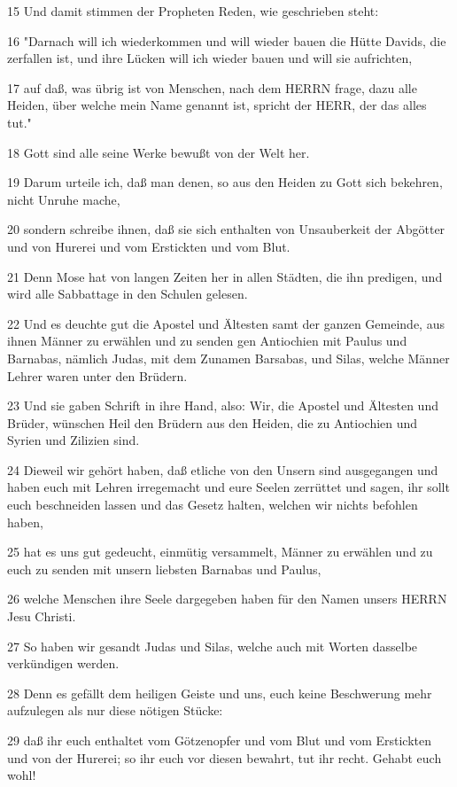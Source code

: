 \par 15 Und damit stimmen der Propheten Reden, wie geschrieben steht:
\par 16 "Darnach will ich wiederkommen und will wieder bauen die Hütte Davids, die zerfallen ist, und ihre Lücken will ich wieder bauen und will sie aufrichten,
\par 17 auf daß, was übrig ist von Menschen, nach dem HERRN frage, dazu alle Heiden, über welche mein Name genannt ist, spricht der HERR, der das alles tut."
\par 18 Gott sind alle seine Werke bewußt von der Welt her.
\par 19 Darum urteile ich, daß man denen, so aus den Heiden zu Gott sich bekehren, nicht Unruhe mache,
\par 20 sondern schreibe ihnen, daß sie sich enthalten von Unsauberkeit der Abgötter und von Hurerei und vom Erstickten und vom Blut.
\par 21 Denn Mose hat von langen Zeiten her in allen Städten, die ihn predigen, und wird alle Sabbattage in den Schulen gelesen.
\par 22 Und es deuchte gut die Apostel und Ältesten samt der ganzen Gemeinde, aus ihnen Männer zu erwählen und zu senden gen Antiochien mit Paulus und Barnabas, nämlich Judas, mit dem Zunamen Barsabas, und Silas, welche Männer Lehrer waren unter den Brüdern.
\par 23 Und sie gaben Schrift in ihre Hand, also: Wir, die Apostel und Ältesten und Brüder, wünschen Heil den Brüdern aus den Heiden, die zu Antiochien und Syrien und Zilizien sind.
\par 24 Dieweil wir gehört haben, daß etliche von den Unsern sind ausgegangen und haben euch mit Lehren irregemacht und eure Seelen zerrüttet und sagen, ihr sollt euch beschneiden lassen und das Gesetz halten, welchen wir nichts befohlen haben,
\par 25 hat es uns gut gedeucht, einmütig versammelt, Männer zu erwählen und zu euch zu senden mit unsern liebsten Barnabas und Paulus,
\par 26 welche Menschen ihre Seele dargegeben haben für den Namen unsers HERRN Jesu Christi.
\par 27 So haben wir gesandt Judas und Silas, welche auch mit Worten dasselbe verkündigen werden.
\par 28 Denn es gefällt dem heiligen Geiste und uns, euch keine Beschwerung mehr aufzulegen als nur diese nötigen Stücke:
\par 29 daß ihr euch enthaltet vom Götzenopfer und vom Blut und vom Erstickten und von der Hurerei; so ihr euch vor diesen bewahrt, tut ihr recht. Gehabt euch wohl!
